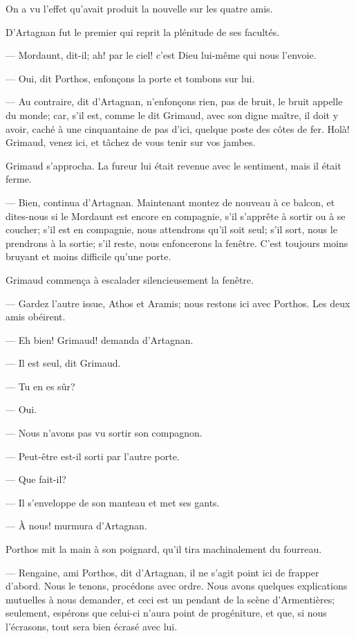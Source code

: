 On a vu l'effet qu'avait produit la nouvelle sur les quatre amis.

D'Artagnan fut le premier qui reprit la plénitude de ses facultés.

— Mordaunt, dit-il; ah! par le ciel! c'est Dieu lui-même qui nous l'envoie.

— Oui, dit Porthos, enfonçons la porte et tombons sur lui.

— Au contraire, dit d'Artagnan, n'enfonçons rien, pas de bruit, le bruit appelle du monde; car, s'il est, comme le dit Grimaud, avec son digne maître, il doit y avoir, caché à une cinquantaine de pas d'ici, quelque poste des côtes de fer. Holà! Grimaud, venez ici, et tâchez de vous tenir sur vos jambes.

Grimaud s'approcha. La fureur lui était revenue avec le sentiment, mais il était ferme.

— Bien, continua d'Artagnan. Maintenant montez de nouveau à ce balcon, et dites-nous si le Mordaunt est encore en compagnie, s'il s'apprête à sortir ou à se coucher; s'il est en compagnie, nous attendrons qu'il soit seul; s'il sort, nous le prendrons à la sortie; s'il reste, nous enfoncerons la fenêtre. C'est toujours moins bruyant et moins difficile qu'une porte.

Grimaud commença à escalader silencieusement la fenêtre.

— Gardez l'autre issue, Athos et Aramis; nous restons ici avec Porthos.
Les deux amis obéirent.

— Eh bien! Grimaud! demanda d'Artagnan.

— Il est seul, dit Grimaud.

— Tu en es sûr?

— Oui.

— Nous n'avons pas vu sortir son compagnon.

— Peut-être est-il sorti par l'autre porte.

— Que fait-il?

— Il s'enveloppe de son manteau et met ses gants.

— À nous! murmura d'Artagnan.

Porthos mit la main à son poignard, qu'il tira machinalement du fourreau.

— Rengaine, ami Porthos, dit d'Artagnan, il ne s'agit point ici de frapper d'abord. Nous le tenons, procédons avec ordre. Nous avons quelques explications mutuelles à nous demander, et ceci est un pendant de la scène d'Armentières; seulement, espérons que celui-ci n'aura point de progéniture, et que, si nous l'écrasons, tout sera bien écrasé avec lui.

